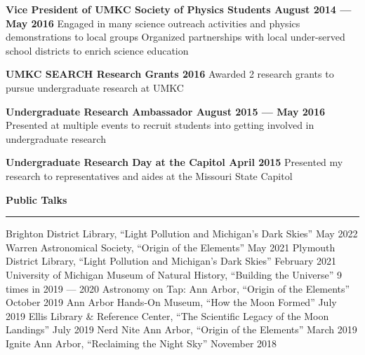 \documentclass[10pt]{article}
\newcommand{\header}[1]{\vspace{2em}\par \textbf{\large #1}\strut\hrule\vspace{0em}}
\newcommand{\actionHeader}[2]{\textbf{#1 \hfill #2}}
\newcommand{\justifiedItemDate}[2]{\newline\null#1 \hfill #2}
\newcommand{\justifiedItemDateFirst}[2]{#1 \hfill #2}
\newcommand{\indentedItem}[1]{\newline\null\qquad #1}
\begin{document}
\actionHeader{Vice President of UMKC Society of Physics Students}{August 2014 --- May 2016}
\indentedItem{Engaged in many science outreach activities and physics demonstrations to local groups}
\indentedItem{Organized partnerships with local under-served school districts to enrich science education}

\actionHeader{UMKC SEARCH Research Grants}{2016}
\indentedItem{Awarded 2 research grants to pursue undergraduate research at UMKC}

\actionHeader{Undergraduate Research Ambassador}{August 2015 --- May 2016}
\indentedItem{Presented at multiple events to recruit students into getting involved in undergraduate research}

\actionHeader{Undergraduate Research Day at the Capitol}{April 2015}
\indentedItem{Presented my research to representatives and aides at the Missouri State Capitol}

\header{Public Talks}
\justifiedItemDateFirst{Brighton District Library, ``Light Pollution and Michigan's Dark Skies'' }{May 2022}
\justifiedItemDate{Warren Astronomical Society, ``Origin of the Elements''}{May 2021}
\justifiedItemDate{Plymouth District Library, ``Light Pollution and Michigan's Dark Skies''}{February 2021}
\justifiedItemDate{University of Michigan Museum of Natural History, ``Building the Universe''}{9 times in 2019 --- 2020}
\justifiedItemDate{Astronomy on Tap: Ann Arbor, ``Origin of the Elements''}{October 2019}
\justifiedItemDate{Ann Arbor Hands-On Museum, ``How the Moon Formed''}{July 2019}
\justifiedItemDate{Ellis Library \& Reference Center, ``The Scientific Legacy of the Moon Landings''}{July 2019}
\justifiedItemDate{Nerd Nite Ann Arbor, ``Origin of the Elements''}{March 2019}
\justifiedItemDate{Ignite Ann Arbor, ``Reclaiming the Night Sky''}{November 2018}
\end{document}
